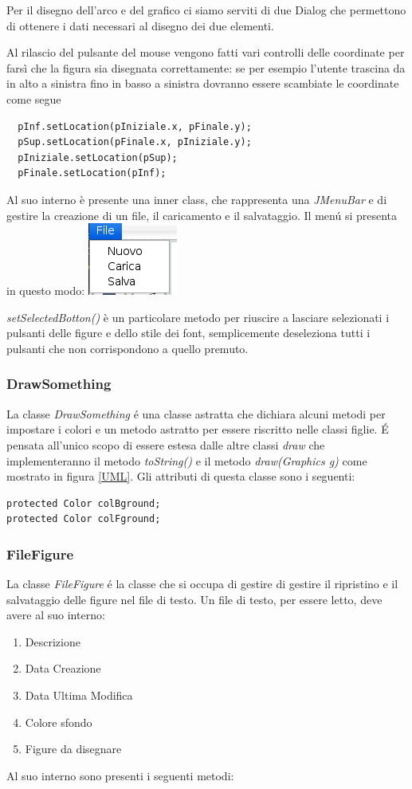 \documentclass[a4paper,12pt,times,numbered,print,index]{article}
\begin{document}
Per il disegno dell'arco e del grafico ci siamo serviti di due Dialog che permettono di ottenere i dati necessari al disegno dei due elementi.


Al rilascio del pulsante del mouse vengono fatti vari controlli delle coordinate per farsì che la figura sia disegnata correttamente: se per esempio l'utente trascina da in alto a sinistra fino in basso a sinistra dovranno essere scambiate le coordinate come segue
\begin{lstlisting}
  pInf.setLocation(pIniziale.x, pFinale.y);
  pSup.setLocation(pFinale.x, pIniziale.y);
  pIniziale.setLocation(pSup);
  pFinale.setLocation(pInf);
\end{lstlisting}
Al suo interno è presente una inner class, che rappresenta una \textit{JMenuBar} e di gestire la creazione di un file, il caricamento e il salvataggio. Il menú si presenta in questo modo:
\includegraphics{Immagini/menu.png}

\textit{setSelectedBotton()} è un particolare metodo per riuscire a lasciare selezionati i pulsanti delle figure e dello stile dei font, semplicemente deseleziona tutti i pulsanti che non corrispondono a quello premuto.

\subsubsection{DrawSomething}
La classe \textit{DrawSomething} é una classe astratta che dichiara alcuni metodi per impostare i colori e un metodo astratto per essere riscritto nelle classi figlie.
É pensata all'unico scopo di essere estesa dalle altre classi \textit{draw} che implementeranno il metodo \textit{toString()} e il metodo \textit{draw(Graphics g)} come mostrato in figura \ref{UML}.
Gli attributi di questa classe sono i seguenti:
\begin{lstlisting}
protected Color colBground;
protected Color colFground;
\end{lstlisting}

\subsubsection{FileFigure}
La classe \textit{FileFigure} é la classe che si occupa di gestire di gestire il ripristino e il salvataggio delle figure nel file di testo.
Un file di testo, per essere letto, deve avere al suo interno:
\begin{enumerate}
\item Descrizione
\item Data Creazione
\item Data Ultima Modifica
\item Colore sfondo
\item Figure da disegnare
\end{enumerate}
Al suo interno sono presenti i seguenti metodi:
\end{document}
